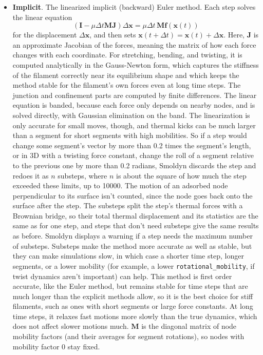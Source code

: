 \documentclass {scrbook}
\newcommand {\ttt} {\texttt}
\begin{document}
\begin{itemize}
\item \textbf{Implicit}. The linearized implicit (backward) Euler method. Each step solves the linear equation
$$(\bm{I} - \mu\Delta t\bm{M}\bm{J})\Delta \bm{x} = \mu\Delta t\,\bm{M}\bm{f}(\bm{x}(t))$$
for the displacement $\Delta \bm{x}$, and then sets $\bm{x}(t+\Delta t)=\bm{x}(t)+\Delta \bm{x}$. Here, $\bm{J}$ is an approximate Jacobian of the forces, meaning the matrix of how each force changes with each coordinate. For stretching, bending, and twisting, it is computed analytically in the Gauss-Newton form, which captures the stiffness of the filament correctly near its equilibrium shape and which keeps the method stable for the filament's own forces even at long time steps. The junction and confinement parts are computed by finite differences. The linear equation is banded, because each force only depends on nearby nodes, and is solved directly, with Gaussian elimination on the band. The linearization is only accurate for small moves, though, and thermal kicks can be much larger than a segment for short segments with high mobilities. So if a step would change some segment's vector by more than 0.2 times the segment's length, or in 3D with a twisting force constant, change the roll of a segment relative to the previous one by more than 0.2 radians, Smoldyn discards the step and redoes it as $n$ substeps, where $n$ is about the square of how much the step exceeded these limits, up to 10000. The motion of an adsorbed node perpendicular to its surface isn't counted, since the node goes back onto the surface after the step. The substeps split the step's thermal forces with a Brownian bridge, so their total thermal displacement and its statistics are the same as for one step, and steps that don't need substeps give the same results as before. Smoldyn displays a warning if a step needs the maximum number of substeps. Substeps make the method more accurate as well as stable, but they can make simulations slow, in which case a shorter time step, longer segments, or a lower mobility (for example, a lower \ttt{rotational\_mobility}, if twist dynamics aren't important) can help. This method is first order accurate, like the Euler method, but remains stable for time steps that are much longer than the explicit methods allow, so it is the best choice for stiff filaments, such as ones with short segments or large force constants. At long time steps, it relaxes fast motions more slowly than the true dynamics, which does not affect slower motions much. $\bm{M}$ is the diagonal matrix of node mobility factors (and their averages for segment rotations), so nodes with mobility factor 0 stay fixed.


\end{itemize}
\end{document}
